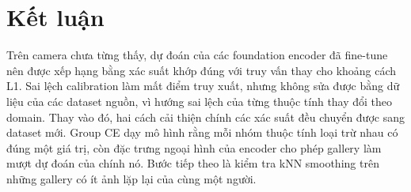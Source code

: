 \documentclass[10pt,twocolumn,letterpaper]{article}
\begin{document}
\section{Kết luận}
\label{sec:conclusion}

Trên camera chưa từng thấy, dự đoán của các foundation encoder đã fine-tune nên được xếp hạng bằng xác suất khớp đúng với truy vấn thay cho khoảng cách L1. Sai lệch calibration làm mất điểm truy xuất, nhưng không sửa được bằng dữ liệu của các dataset nguồn, vì hướng sai lệch của từng thuộc tính thay đổi theo domain. Thay vào đó, hai cách cải thiện chính các xác suất đều chuyển được sang dataset mới. Group CE dạy mô hình rằng mỗi nhóm thuộc tính loại trừ nhau có đúng một giá trị, còn đặc trưng ngoại hình của encoder cho phép gallery làm mượt dự đoán của chính nó. Bước tiếp theo là kiểm tra kNN smoothing trên những gallery có ít ảnh lặp lại của cùng một người.

{\small


}
\end{document}
